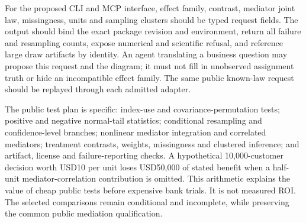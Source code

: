For the proposed CLI and MCP interface, effect family, contrast, mediator joint
law, missingness, units and sampling clusters should be typed request fields.
The output should bind the exact package revision and environment, return all
failure and resampling counts, expose numerical and scientific refusal, and
reference large draw artifacts by identity. An agent translating a business
question may propose this request and the diagram; it must not fill in
unobserved assignment truth or hide an incompatible effect family. The same
public known-law request should be replayed through each admitted adapter.

The public test plan is specific: index-use and covariance-permutation tests;
positive and negative normal-tail statistics; conditional resampling and
confidence-level branches; nonlinear mediator integration and correlated
mediators; treatment contrasts, weights, missingness and clustered inference;
and artifact, license and failure-reporting checks. A hypothetical 10,000-customer
decision worth USD10 per unit loses USD50,000 of stated benefit when a
half-unit mediator-correlation contribution is omitted. This arithmetic explains
the value of cheap public tests before expensive bank trials. It is not measured
ROI. The selected comparisons remain conditional and incomplete, while
preserving the common public mediation qualification.~\citep{exec25_omed_choice}
